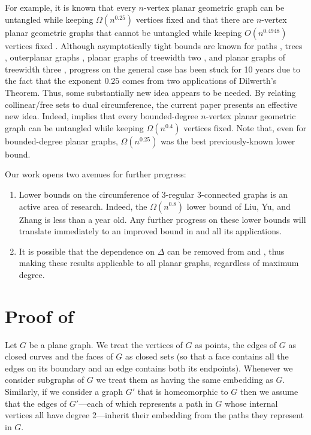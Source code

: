 \documentclass{patmorin}
\begin{document}
For example, it is known that every $n$-vertex planar geometric
graph can be untangled while keeping $\Omega(n^{0.25})$ vertices fixed
\cite{bose.dujmovic.ea:polynomial} and that there are $n$-vertex planar
geometric graphs that cannot be untangled while keeping $O(n^{0.4948})$
vertices fixed \cite{cano.toth.ea:upper}. Although asymptotically
tight bounds are known for paths \cite{cibulka:untangling},
trees \cite{goaoc.kratochvil.ea:untangling}, outerplanar graphs
\cite{goaoc.kratochvil.ea:untangling}, planar graphs of treewidth
two \cite{ravsky.verbitsky:on}, and planar graphs of treewidth three
\cite{dalozzo.dujmovic.ea:drawing}, progress on the general case has
been stuck for 10 years due to the fact that the exponent $0.25$ comes
from two applications of Dilwerth's Theorem.  Thus, some substantially
new idea appears to be needed. By relating collinear/free sets to
dual circumference, the current paper presents an effective new idea.
Indeed,  implies that every bounded-degree $n$-vertex
planar geometric graph can be untangled while keeping $\Omega(n^{0.4})$
vertices fixed.  Note that, even for bounded-degree planar graphs,
$\Omega(n^{0.25})$ was the best previously-known lower bound.

Our work opens two avenues for further progress:

\begin{enumerate}
   \item Lower bounds on the circumference of 3-regular
      3-connected graphs is an active area of research. Indeed,
      the $\Omega(n^{0.8})$ lower bound of Liu, Yu, and Zhang
      \cite{liu.yu.zhang:circumference} is less than a year old.  Any
      further progress on these lower bounds will translate immediately
      to an improved bound in  and all its applications.

   \item It is possible that the dependence on $\Delta$ can be removed
      from  and , thus making these results
      applicable to all planar graphs, regardless of maximum degree.
\end{enumerate}

\section{Proof of }

Let $G$ be a plane graph.  We treat the vertices of $G$ as points,
the edges of $G$ as closed curves and the faces of $G$ as closed sets
(so that a face contains all the edges on its boundary and an edge
contains both its endpoints).  Whenever we consider subgraphs of $G$
we treat them as having the same embedding as $G$.  Similarly, if we
consider a graph $G'$ that is homeomorphic to $G$ then we assume
that the edges of $G'$---each of which represents a path in $G$
whose internal vertices all have degree 2---inherit their embedding from
the paths they represent in $G$.
\end{document}
